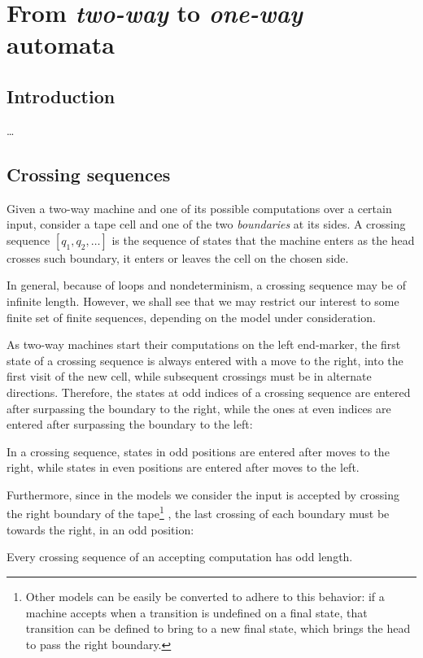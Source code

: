 \chapter{From \emph{two-way} to \emph{one-way} automata}



\section{Introduction}
\dots


\section{Crossing sequences}\label{sec:crossseq2DFA}
Given a two-way machine and one of its possible computations over a certain input, consider a tape cell and one of the two \emph{boundaries} at its sides.
A crossing sequence $[q_1,q_2,\dots]$ is the sequence of states that the machine enters as the head crosses such boundary, \ie it enters or leaves the cell on the chosen side.

In general, because of loops and nondeterminism, a crossing sequence may be of infinite length.
However, we shall see that we may restrict our interest to some finite set of finite sequences, depending on the model under consideration.

As two-way machines start their computations on the left end-marker, the first state of a crossing sequence is always entered with a move to the right, into the first visit of the new cell, while subsequent crossings must be in alternate directions.
Therefore, the states at odd indices of a crossing sequence are entered after surpassing the boundary to the right, while the ones at even indices are entered after surpassing the boundary to the left:
\begin{fact}\label{fact:crossing-parity}
	In a crossing sequence, states in odd positions are entered after moves to the right, while states in even positions are entered after moves to the left.
\end{fact}

Furthermore, since in the models we consider the input is accepted by crossing the right boundary of the tape\footnote{%
	Other models can be easily be converted to adhere to this behavior: if a machine accepts when a transition is undefined on a final state, that transition can be defined to bring to a new final state, which brings the head to pass the right boundary.}%
, the last crossing of each boundary must be towards the right, \ie in an odd position:
\begin{fact}\label{fact:crossing-length}
	Every crossing sequence of an accepting computation has odd length.
\end{fact}


